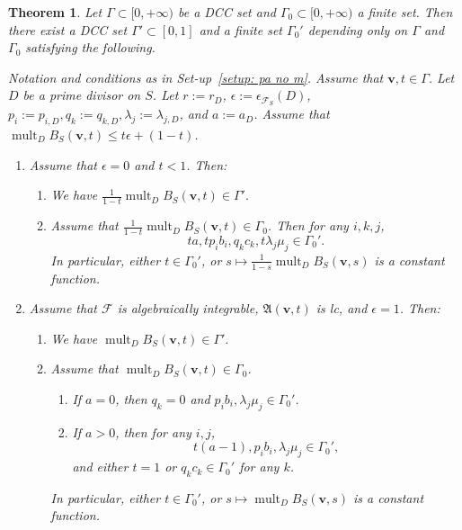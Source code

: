 \documentclass[11pt,reqno]{amsart}
\numberwithin{equation}{section}
\newcommand{\mult}{\operatorname{mult}}
\newcommand{\Aa}{{\mathfrak{A}}}
\newcommand{\Ff}{\mathcal{F}}
\newcommand{\Ii}{\Gamma}
\newtheorem{thm}{Theorem}[section]
\theoremstyle{definition}
\begin{document}
\begin{thm}\label{thm: dcc precise adjunction}
Let $\Ii\subset [0,+\infty)$ be a DCC set and $\Ii_0\subset [0,+\infty)$ a finite set. Then there exist a DCC set $\Ii'\subset [0,1]$ and a finite set $\Ii_0'$ depending only on $\Ii$ and $\Ii_0$ satisfying the following.

Notation and conditions as in Set-up~\ref{setup: pa no m}. Assume that $\bm{v},t\in\Ii$. Let $D$ be a prime divisor on $S$. Let $r:=r_D$, $\epsilon:=\epsilon_{\Ff_S}(D)$, $p_i:=p_{i,D},q_k:=q_{k,D},\lambda_j:=\lambda_{j,D}$, and $a:=a_D$. Assume that $\mult_DB_S(\bm{v},t)\leq t\epsilon+(1-t)$.
\begin{enumerate}
    \item Assume that $\epsilon=0$ and $t<1$. Then:
    \begin{enumerate}
        \item We have
            $\frac{1}{1-t}\mult_DB_S(\bm{v},t)\in\Ii'.$
        \item Assume that $\frac{1}{1-t}\mult_DB_S(\bm{v},t)\in\Ii_0$. Then for any $i,k,j$,
        $$ta,tp_ib_i,q_kc_k,t\lambda_j\mu_j\in\Ii_0'.$$
      In particular, either $t\in\Ii_0'$, or $s\mapsto\frac{1}{1-s}\mult_DB_S(\bm{v},s)$ is a constant function.
    \end{enumerate}
\item Assume that $\Ff$ is algebraically integrable, $\Aa(\bm{v},t)$ is lc, and $\epsilon=1$. Then:
  \begin{enumerate}
        \item We have
            $\mult_DB_S(\bm{v},t)\in\Ii'.$
        \item Assume that $\mult_DB_S(\bm{v},t)\in\Ii_0$.
        \begin{enumerate}
            \item If $a=0$, then $q_k=0$ and $p_ib_i,\lambda_j\mu_j\in\Ii_0'$.
            \item If $a>0$, then for any $i,j$,
            $$t(a-1),p_ib_i,\lambda_j\mu_j\in\Ii_0',$$
            and either $t=1$ or $q_kc_k\in\Ii_0'$ for any $k$.
        \end{enumerate}
In particular, either $t\in\Ii_0'$, or $s\mapsto\mult_DB_S(\bm{v},s)$ is a constant function.
    \end{enumerate}
\end{enumerate}
\end{thm}
\end{document}
